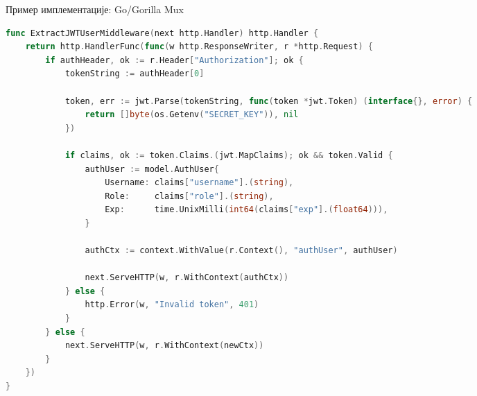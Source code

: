 \documentclass{beamer}
\begin{document}
        \begin{frame}[fragile]{Пример имплементације: Go/Gorilla Mux}
    	\begin{adjustbox}{width=\textwidth,height=\textheight,keepaspectratio}
			\begin{lstlisting}[language=go]
func ExtractJWTUserMiddleware(next http.Handler) http.Handler {
	return http.HandlerFunc(func(w http.ResponseWriter, r *http.Request) {
		if authHeader, ok := r.Header["Authorization"]; ok {
			tokenString := authHeader[0]

			token, err := jwt.Parse(tokenString, func(token *jwt.Token) (interface{}, error) {
				return []byte(os.Getenv("SECRET_KEY")), nil
			})

			if claims, ok := token.Claims.(jwt.MapClaims); ok && token.Valid {
				authUser := model.AuthUser{
					Username: claims["username"].(string),
					Role:     claims["role"].(string),
					Exp:      time.UnixMilli(int64(claims["exp"].(float64))),
				}

				authCtx := context.WithValue(r.Context(), "authUser", authUser)

				next.ServeHTTP(w, r.WithContext(authCtx))
			} else {
				http.Error(w, "Invalid token", 401)
			}
		} else {
			next.ServeHTTP(w, r.WithContext(newCtx))
		}
	})
}
			\end{lstlisting}
		\end{adjustbox}
    \end{frame}
    
\end{document}
